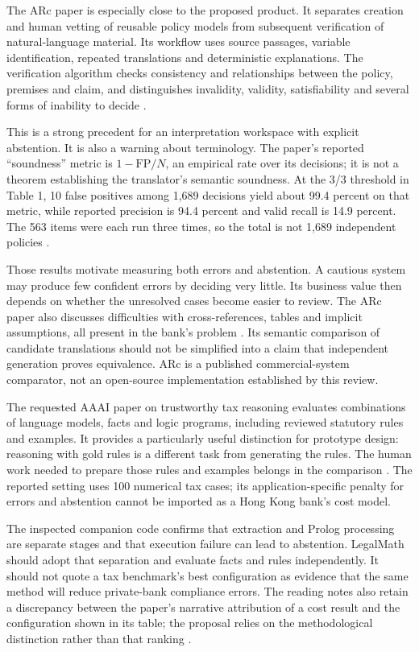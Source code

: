 The ARc paper is especially close to the proposed product. It separates creation
and human vetting of reusable policy models from subsequent verification of
natural-language material. Its workflow uses source passages, variable
identification, repeated translations and deterministic explanations. The
verification algorithm checks consistency and relationships between the policy,
premises and claim, and distinguishes invalidity, validity, satisfiability and
several forms of inability to decide
\citep[sec.~3 and Algorithm~1]{arc2025}.

This is a strong precedent for an interpretation workspace with explicit
abstention. It is also a warning about terminology. The paper's reported
``soundness'' metric is $1-\mathrm{FP}/N$, an empirical rate over its decisions;
it is not a theorem establishing the translator's semantic soundness. At the
3/3 threshold in Table 1, 10 false positives among 1,689 decisions yield about
99.4 percent on that metric, while reported precision is 94.4 percent and valid
recall is 14.9 percent. The 563 items were each run three times, so the total is
not 1,689 independent policies \citep[sec.~4, Table~1]{arc2025}.

Those results motivate measuring both errors and abstention. A cautious system
may produce few confident errors by deciding very little. Its business value
then depends on whether the unresolved cases become easier to review. The ARc
paper also discusses difficulties with cross-references, tables and implicit
assumptions, all present in the bank's problem
\citep[sec.~5 and app.~A.1]{arc2025}. Its semantic comparison of candidate
translations should not be simplified into a claim that independent generation
proves equivalence. ARc is a published commercial-system comparator, not an
open-source implementation established by this review.

The requested AAAI paper on trustworthy tax reasoning evaluates combinations of
language models, facts and logic programs, including reviewed statutory rules and
examples. It provides a particularly useful distinction for prototype design:
reasoning with gold rules is a different task from generating the rules. The
human work needed to prepare those rules and examples belongs in the comparison
\citep[Tables~2--3]{jurayj2026,jurayj2025extended}. The reported setting uses
100 numerical tax cases; its application-specific penalty for errors and abstention
cannot be imported as a Hong Kong bank's cost model.

The inspected companion code confirms that extraction and Prolog processing are
separate stages and that execution failure can lead to abstention. LegalMath
should adopt that separation and evaluate facts and rules independently. It
should not quote a tax benchmark's best configuration as evidence that the same
method will reduce private-bank compliance errors. The reading notes also retain
a discrepancy between the paper's narrative attribution of a cost result and
the configuration shown in its table; the proposal relies on the methodological
distinction rather than that ranking \citep{libraryreview}.

